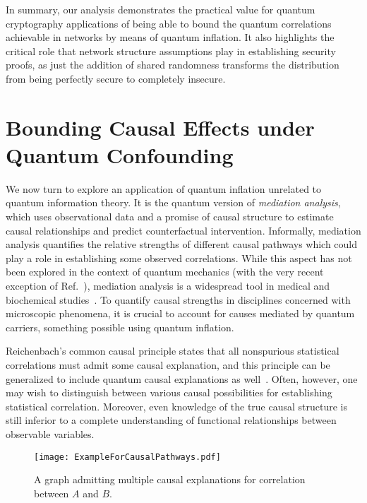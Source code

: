 \documentclass[superscriptaddress,aps,prx,nofootinbib,twocolumn,twoside,reprint,letterpaper,longbibliography]{revtex4-2}
\begin{document}
In summary, our analysis demonstrates the practical value for quantum cryptography applications of being able to bound the quantum correlations achievable in networks by means of quantum inflation. It also highlights the critical role that network structure assumptions play in establishing security proofs, as just the addition of shared randomness transforms the distribution from being perfectly secure to completely insecure.

\section{Bounding Causal Effects under Quantum Confounding}\label{sec:mediationanalysis}
We now turn to explore an application of quantum inflation unrelated to quantum information theory.
It is the quantum version of \emph{mediation analysis}, which uses observational data and a promise of causal structure to estimate causal relationships and predict counterfactual intervention. Informally, mediation analysis quantifies the relative strengths of different causal pathways which could play a role in establishing some observed correlations.
While this aspect has not been explored in the context of quantum mechanics (with the very recent exception of Ref.~\cite{Quantifying2020}), mediation analysis is a widespread tool in medical and biochemical studies~\cite{huang2016mediation,hutton2018mediation,sohn2019microbiome}.
To quantify causal strengths in disciplines concerned with microscopic phenomena, it is crucial to account for causes mediated by quantum carriers, something possible using quantum inflation.

Reichenbach's common causal principle states that all nonspurious statistical correlations must admit some causal explanation, and this principle can be generalized to include quantum causal explanations as well~\cite{Wood2015,Cavalcanti2014RCCP,Allen2017RCCP,WolfeBellQuantified}. Often, however, one may wish to distinguish between various causal possibilities for establishing statistical correlation. Moreover, even knowledge of the true causal structure is still inferior to a complete understanding of functional relationships between observable variables.

\begin{figure}[b]
  \begin{center}
     \centering\texttt{[image: ExampleForCausalPathways.pdf]}
  \end{center}
  \caption[]{A graph admitting multiple causal explanations for correlation between $A$ and $B$.
  \label{fig:ExampleForCausalPathways}
  }
\end{figure}
\end{document}
